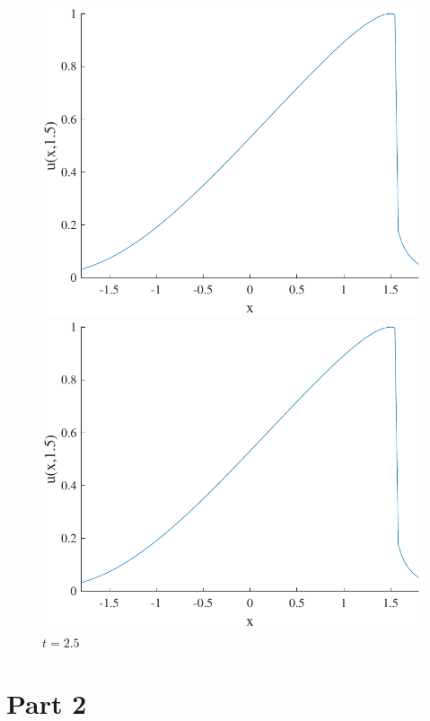 \documentclass{article}
\begin{document}
\begin{figure}[H]
  \centering
  \begin{minipage}[b]{0.49\textwidth}
    \includegraphics[width=\textwidth]{hw_13_plot6.pdf}
    \caption{$t = 1.5$}

  \end{minipage}
  \hfill
  \begin{minipage}[b]{0.49\textwidth}
    \includegraphics[width=\textwidth]{hw_13_plot6.pdf}
    \caption{$t = 2.5$}

  \end{minipage}
    \hfill
\end{figure}
\section*{Part 2}
\end{document}
